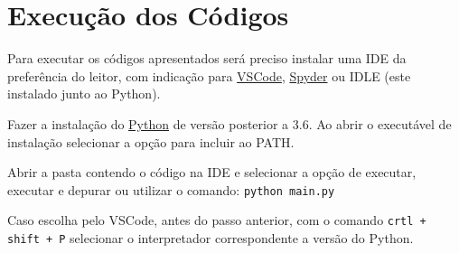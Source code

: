\documentclass[10pt,conference]{IEEEtran}
\begin{document}
\section*{Execução dos Códigos}
Para executar os códigos apresentados será preciso instalar uma IDE da preferência do leitor, com indicação para \href{https://code.visualstudio.com/download}{VSCode}, \href{https://docs.spyder-ide.org/3/installation.html}{Spyder} ou IDLE (este instalado junto ao Python). 

Fazer a instalação do \href{https://www.python.org/downloads/}{Python} de versão posterior a 3.6. Ao abrir o executável de instalação selecionar a opção para incluir ao PATH.

Abrir a pasta contendo o código na IDE e selecionar a opção de executar, executar e depurar ou utilizar o comando: \verb|python main.py|

Caso escolha pelo VSCode, antes do passo anterior, com o comando \verb|crtl + shift + P| selecionar o interpretador correspondente a versão do Python. 







\end{document}
